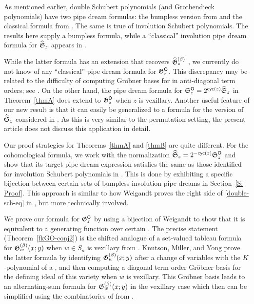 \documentclass[10pt]{article}
\begin{document}
\begin{remark}
As mentioned earlier, 
double Schubert polynomials (and Grothendieck polynomials)
have two pipe dream formulas:
the bumpless version from \cite{LLS,Weigandt} and the classical formula
from \cite{BergeronBilley, fomin1994grothendieck,KnutsonMiller}.
The same is true of involution Schubert polynomials.
 The results here supply a bumpless formula, while a ``classical'' involution   pipe dream formula for $\widehat{\mathfrak S}_z$
appears in \cite{HMP6}.


While the latter formula has an extension that recovers $\widehat{\mathfrak{G}}^{(\beta)}_z$ \cite[Thm.~4.5]{MarbergPawlowski}, we currently do not know of any ``classical'' pipe dream formula for $\mathfrak{G}^{\mathsf{O}}_z$. 
 This discrepancy may be related to the difficulty of computing 
 Gr\"obner bases for  in anti-diagonal term orders; see \cite{MarPaw2024}.
 On the other hand, the pipe dream formula for $\mathfrak S^{\mathsf{O}}_z=2^{\textsf{cyc}(z)}\widehat{\mathfrak S}_z$ in Theorem~\ref{thmA} does extend to $\mathfrak{G}^{\mathsf{O}}_z$ when $z$ is vexillary.
 Another useful feature of our new result is that it can easily be generalized to a formula for
the  version of $\widehat{\mathfrak S}_z$ considered in \cite{MarbergPawlowski,Pawlowski2021Universal}. As this is very similar to the permutation setting, the present article does not discuss this application in detail.
 \end{remark}
 
 
Our proof strategies for Theorems~\ref{thmA} and \ref{thmB} are quite different.
For the cohomological formula, we work with the normalization 
$\widehat{\mathfrak S}_z = 2^{-\textsf{cyc}(z)}\mathfrak S^{\mathsf{O}}_z$ and  
show that its target pipe dream expression
satisfies the same 
as those identified for involution Schubert polynomials in \cite{HMP3}.
This is done by exhibiting a specific bijection
between certain sets of bumpless involution pipe dreams in Section~\ref{S: Proof}. This approach is similar to how Weigandt proves the right side of \eqref{double-sch-eq} in \cite{Weigandt}, but more technically involved.

We prove our formula for $\mathfrak{G}^{\mathsf{O}}_z$ by using a bijection of Weigandt \cite{Weigandt} to show that it is equivalent to a generating function over 
certain . The precise statement 
(Theorem~\ref{fkGO-conj2}) is the shifted analogue
of a set-valued tableau formula for $\mathfrak{G}^{(\beta)}_w(x;y)$
when $w \in S_n$ is vexillary from \cite{KnutsonMillerYong}.
Knutson, Miller, and Yong prove the latter formula
by identifying $\mathfrak{G}^{(\beta)}_w(x;y)$ after a change of variables with the $K$-polynomial
of a , and then computing a diagonal term order Gr\"obner basis for the defining ideal of this variety when $w$ is vexillary. This Gr\"obner basis 
leads to an alternating-sum formula for $\mathfrak{G}^{(\beta)}_w(x;y)$ in the vexillary case which then can be simplified using the combinatorics of  from
\cite{KnutsonMillerSubword}.
\end{document}
